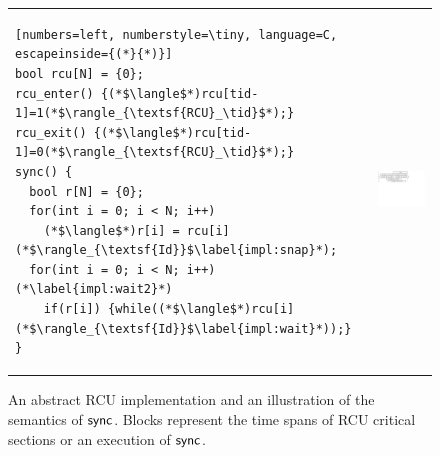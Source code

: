 \begin{figure}[t]
\begin{tabular}{@{\quad\ }l@{;}r@{}}
\begin{minipage}{0.5\textwidth}
{\figfontsize
\begin{lstlisting}[numbers=left, numberstyle=\tiny, language=C, escapeinside={(*}{*)}]
bool rcu[N] = {0};
rcu_enter() {(*$\langle$*)rcu[tid-1]=1(*$\rangle_{\textsf{RCU}_\tid}$*);} 
rcu_exit() {(*$\langle$*)rcu[tid-1]=0(*$\rangle_{\textsf{RCU}_\tid}$*);} 
sync() {
  bool r[N] = {0};
  for(int i = 0; i < N; i++) 
    (*$\langle$*)r[i] = rcu[i](*$\rangle_{\textsf{Id}}$\label{impl:snap}*);
  for(int i = 0; i < N; i++) (*\label{impl:wait2}*)
    if(r[i]) {while((*$\langle$*)rcu[i](*$\rangle_{\textsf{Id}}$\label{impl:wait}*));}
}
\end{lstlisting}
}
\end{minipage}
&
\!\!\!\!\!\!\!\!\!\!\!\!\!\!\!\!\!\!\!
\begin{minipage}{0.63\textwidth}
\includegraphics[scale=.275, trim= 0 18.5cm 0 0.1cm]{sync}
\end{minipage}
\end{tabular}
 \caption{\small An abstract RCU implementation and an illustration of the semantics of ${\sf sync}$. 
  Blocks represent the time spans of RCU critical sections or an execution of ${\sf sync}$.}
\label{fig:timeline}\label{fig:RCUProofSketch} 
\end{figure}

